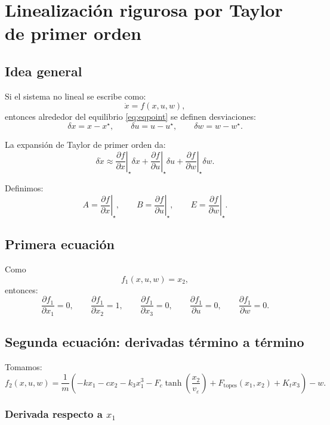 \documentclass[11pt]{article}
\begin{document}
\section{Linealizaci\'on rigurosa por Taylor de primer orden}

\subsection{Idea general}

Si el sistema no lineal se escribe como:
\[
\dot x = f(x,u,w),
\]
entonces alrededor del equilibrio \eqref{eq:eqpoint} se definen desviaciones:
\[
\delta x = x-x^\star,\qquad
\delta u = u-u^\star,\qquad
\delta w = w-w^\star.
\]

La expansi\'on de Taylor de primer orden da:
\begin{equation}
\delta \dot x
\approx
\left.\frac{\partial f}{\partial x}\right|_\star \delta x
+
\left.\frac{\partial f}{\partial u}\right|_\star \delta u
+
\left.\frac{\partial f}{\partial w}\right|_\star \delta w.
\label{eq:taylor}
\end{equation}

Definimos:
\begin{equation}
A=\left.\frac{\partial f}{\partial x}\right|_\star,\qquad
B=\left.\frac{\partial f}{\partial u}\right|_\star,\qquad
E=\left.\frac{\partial f}{\partial w}\right|_\star.
\end{equation}

\subsection{Primera ecuaci\'on}

Como
\[
f_1(x,u,w)=x_2,
\]
entonces:
\[
\frac{\partial f_1}{\partial x_1}=0,\qquad
\frac{\partial f_1}{\partial x_2}=1,\qquad
\frac{\partial f_1}{\partial x_3}=0,\qquad
\frac{\partial f_1}{\partial u}=0,\qquad
\frac{\partial f_1}{\partial w}=0.
\]

\subsection{Segunda ecuaci\'on: derivadas t\'ermino a t\'ermino}

Tomamos:
\[
f_2(x,u,w)=
\frac{1}{m}
\left(
-kx_1
-cx_2
-k_3 x_1^3
-F_c\tanh\left(\frac{x_2}{v_\varepsilon}\right)
+F_{\text{topes}}(x_1,x_2)
+K_t x_3
\right)
-w.
\]

\subsubsection{Derivada respecto a $x_1$}
\end{document}
